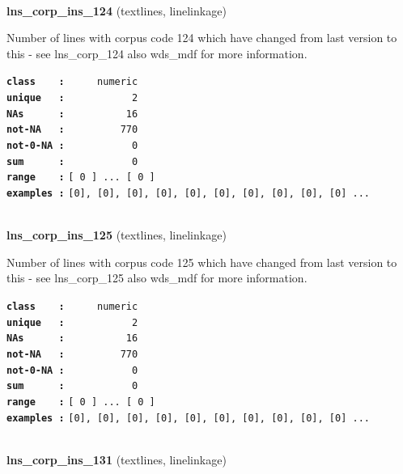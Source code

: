 \documentclass[]{article}
\begin{document}
~

\textbf{lns\_corp\_ins\_124} (textlines, linelinkage)

Number of lines with corpus code 124 which have changed from last
version to this - see lns\_corp\_124 also wds\_mdf for more information.

\textbf{\texttt{class\ \ \ \ :}} \texttt{~~~~~numeric}\\
\textbf{\texttt{unique\ \ \ :}} \texttt{~~~~~~~~~~~2}\\
\textbf{\texttt{NAs\ \ \ \ \ \ :}} \texttt{~~~~~~~~~~16}\\
\textbf{\texttt{not-NA\ \ \ :}} \texttt{~~~~~~~~~770}\\
\textbf{\texttt{not-0-NA\ :}} \texttt{~~~~~~~~~~~0}\\
\textbf{\texttt{sum\ \ \ \ \ \ :}} \texttt{~~~~~~~~~~~0}\\
\textbf{\texttt{range\ \ \ \ :}}
\texttt{{[}\ 0\ {]}\ ...\ {[}\ 0\ {]}}\\
\textbf{\texttt{examples\ :}}
\texttt{{[}0{]},\ {[}0{]},\ {[}0{]},\ {[}0{]},\ {[}0{]},\ {[}0{]},\ {[}0{]},\ {[}0{]},\ {[}0{]},\ {[}0{]}\ ...}\\

~

\textbf{lns\_corp\_ins\_125} (textlines, linelinkage)

Number of lines with corpus code 125 which have changed from last
version to this - see lns\_corp\_125 also wds\_mdf for more information.

\textbf{\texttt{class\ \ \ \ :}} \texttt{~~~~~numeric}\\
\textbf{\texttt{unique\ \ \ :}} \texttt{~~~~~~~~~~~2}\\
\textbf{\texttt{NAs\ \ \ \ \ \ :}} \texttt{~~~~~~~~~~16}\\
\textbf{\texttt{not-NA\ \ \ :}} \texttt{~~~~~~~~~770}\\
\textbf{\texttt{not-0-NA\ :}} \texttt{~~~~~~~~~~~0}\\
\textbf{\texttt{sum\ \ \ \ \ \ :}} \texttt{~~~~~~~~~~~0}\\
\textbf{\texttt{range\ \ \ \ :}}
\texttt{{[}\ 0\ {]}\ ...\ {[}\ 0\ {]}}\\
\textbf{\texttt{examples\ :}}
\texttt{{[}0{]},\ {[}0{]},\ {[}0{]},\ {[}0{]},\ {[}0{]},\ {[}0{]},\ {[}0{]},\ {[}0{]},\ {[}0{]},\ {[}0{]}\ ...}\\

~

\textbf{lns\_corp\_ins\_131} (textlines, linelinkage)
\end{document}
